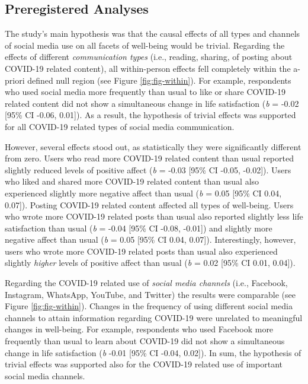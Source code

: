 \documentclass[
  man,mask,floatsintext]{apa7}
\begin{document}
\hypertarget{preregistered-analyses}{%
\subsection{Preregistered Analyses}\label{preregistered-analyses}}

The study's main hypothesis was that the causal effects of all types and channels of social media use on all facets of well-being would be trivial.
Regarding the effects of different \emph{communication types} (i.e., reading, sharing, of posting about COVID-19 related content), all within-person effects fell completely within the a-priori defined null region (see Figure \ref{fig:fig-within}).
For example, respondents who used social media more frequently than usual to like or share COVID-19 related content did not show a simultaneous change in life satisfaction (\emph{b} = -0.02 {[}95\% CI -0.06, 0.01{]}).
As a result, the hypothesis of trivial effects was supported for all COVID-19 related types of social media communication.

However, several effects stood out, as statistically they were significantly different from zero.
Users who read more COVID-19 related content than usual reported slightly reduced levels of positive affect (\emph{b} = -0.03 {[}95\% CI -0.05, -0.02{]}).
Users who liked and shared more COVID-19 related content than usual also experienced slightly more negative affect than usual (\emph{b} = 0.05 {[}95\% CI 0.04, 0.07{]}).
Posting COVID-19 related content affected all types of well-being.
Users who wrote more COVID-19 related posts than usual also reported slightly less life satisfaction than usual (\emph{b} = -0.04 {[}95\% CI -0.08, -0.01{]}) and slightly more negative affect than usual (\emph{b} = 0.05 {[}95\% CI 0.04, 0.07{]}).
Interestingly, however, users who wrote more COVID-19 related posts than usual also experienced slightly \emph{higher} levels of positive affect than usual (\emph{b} = 0.02 {[}95\% CI 0.01, 0.04{]}).

Regarding the COVID-19 related use of \emph{social media channels} (i.e., Facebook, Instagram, WhatsApp, YouTube, and Twitter) the results were comparable (see Figure \ref{fig:fig-within}).
Changes in the frequency of using different social media channels to attain information regarding COVID-19 were unrelated to meaningful changes in well-being.
For example, respondents who used Facebook more frequently than usual to learn about COVID-19 did not show a simultaneous change in life satisfaction (\emph{b} -0.01 {[}95\% CI -0.04, 0.02{]}).
In sum, the hypothesis of trivial effects was supported also for the COVID-19 related use of important social media channels.
\end{document}
